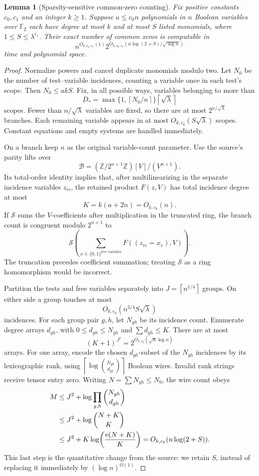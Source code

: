 \documentclass[11pt]{article}
\newtheorem{lemma}[theorem]{Lemma}
\theoremstyle{remark}
\newcommand{\F}{\mathbb F}
\newcommand{\Z}{\mathbb Z}
\newcommand{\ceil}[1]{\left\lceil #1\right\rceil}
\begin{document}
\begin{lemma}[Sparsity-sensitive common-zero counting]\label{lem:query}
Fix positive constants \(c_0,c_1\) and an integer \(k\ge1\).
Suppose \(a\le c_0n\) polynomials in \(n\) Boolean variables over
\(\F_2\) each have degree at most \(k\) and at most \(S\) listed
monomials, where \(1\le S\le\lambda^{c_1}\).
Their exact number of common zeros is computable in
\[
 n^{O_{k,c_0,c_1}(1)}
 2^{O_{k,c_0,c_1}\!\left(
 n\log(2+S)/\sqrt{\log n}\right)}
\]
time and polynomial space.
\end{lemma}
\begin{proof}
Normalize powers and cancel duplicate monomials modulo two.
Let \(N_0\) be the number of test--variable incidences, counting a
variable once in each test's scope. Then \(N_0\le akS\).
Fix, in all possible ways, variables belonging to more than
\[
 D_*=\max\{1,\ceil{N_0/n}\}\ceil{\sqrt\lambda}
\]
scopes. Fewer than \(n/\sqrt\lambda\) variables are fixed, so
there are at most \(2^{n/\sqrt\lambda}\) branches.
Each remaining variable appears in at most
\(O_{k,c_0}(S\sqrt\lambda)\) scopes.
Constant equations and empty systems are handled immediately.

On a branch keep \(n\) as the original variable-count parameter.
Use the source's parity lifts over
\[
 \mathcal B=(\Z/2^{n+1}\Z)[V]/(V^{n+1}).
\]
Its total-order identity implies that, after multilinearizing in the
separate incidence variables \(z_{iv}\), the retained product \(F(z,V)\)
has total incidence degree at most
\begin{equation}\label{eq:incidence-K}
 K=k(a+2n)=O_{k,c_0}(n).
\end{equation}
If \(\mathcal S\) sums the \(V\)-coefficients after multiplication in
the truncated ring, the branch count is congruent modulo \(2^{n+1}\) to
\[
 \mathcal S\!\left(\sum_{x\in\{0,1\}^{\text{free variables}}}
              F((z_{iv}=x_v),V)\right).
\]
The truncation precedes coefficient summation; treating
\(\mathcal S\) as a ring homomorphism would be incorrect.

Partition the tests and free variables separately into
\(J=\ceil{n^{1/4}}\) groups. On either side a group touches at most
\[
 O_{k,c_0}(n^{3/4}S\sqrt\lambda)
\]
incidences. For each group pair \(g,h\), let \(N_{gh}\) be its incidence
count. Enumerate degree arrays \(d_{gh}\), with
\(0\le d_{gh}\le N_{gh}\) and \(\sum d_{gh}\le K\).
There are at most
\[
 (K+1)^{J^2}=2^{O_{k,c_0}(\sqrt n\log n)}
\]
arrays. For one array, encode the chosen \(d_{gh}\)-subset of the
\(N_{gh}\) incidences by its lexicographic rank, using
\(\ceil{\log\binom{N_{gh}}{d_{gh}}}\) Boolean wires.
Invalid rank strings receive tensor entry zero.
Writing \(N=\sum N_{gh}\le N_0\), the wire count obeys
\begin{align}
 M&\le J^2+\log\prod_{g,h}\binom{N_{gh}}{d_{gh}}\notag\\
  &\le J^2+\log\binom{N+K}{K}\notag\\
  &\le J^2+K\log\!\left(\frac{\mathrm e(N+K)}K\right)
     =O_{k,c_0}(n\log(2+S)).\label{eq:wire-budget}
\end{align}
This last step is the quantitative change from the source:
we retain \(S\), instead of replacing it immediately by
\((\log n)^{O(1)}\).


\end{proof}
\end{document}
